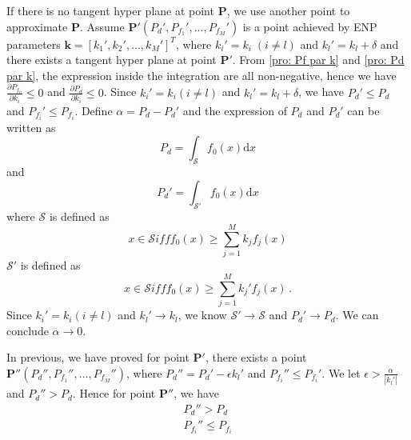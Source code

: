 \documentclass[12pt,journal,a4paper,twoside,onecolumn,draft]{IEEEtran}
\begin{document}
\begin{spacing}{2.5}
If there is no tangent hyper plane at point $\mathbf{P}$, we use another point to approximate $\mathbf{P}$. 
Assume $\mathbf{P}' (P_d', P_{f_1}', ..., P_{f_M}')$ is a point achieved by ENP parameters $\mathbf{k}=[k_1', k_2', ..., k_M']^T$, where $k_i' = k_i \;(i \neq l)$ and $k_l' = k_l + \delta$ and there exists a tangent hyper plane at point $\mathbf{P}'$. From \eqref{pro: Pf par k} and \eqref{pro: Pd par k}, the expression inside the integration are all non-negative, hence we have $\frac{\partial P_{f_n}}{\partial k_i} \leq 0$ and $\frac{\partial P_d}{\partial k_i} \leq 0$. Since $k_i' = k_i (i \neq l)$ and $k_l' = k_l + \delta$, we have $P_d' \leq P_d$ and $P_{f_i}' \leq P_{f_i}$. Define $\alpha = P_d - P_d'$ and the expression of $P_d$ and $P_d'$ can be written as
\begin{equation}
  P_d = \int_{\mathcal{S}}f_0(x)\mathrm{d}x 
\end{equation}
and
\begin{equation}
  P_d' = \int_{\mathcal{S}'}f_0(x)\mathrm{d}x 
\end{equation}
where $\mathcal{S}$ is defined as 
\begin{equation}
x \in \mathcal{S} iff f_0(x) \geq \sum_{j=1}^M k_jf_j(x)
\end{equation}
$\mathcal{S}'$ is defined as
\begin{equation}
x \in \mathcal{S} iff f_0(x) \geq \sum_{j=1}^M k_j'f_j(x)\,.
\end{equation}
Since $k_i' = k_i (i \neq l)$ and $k_l' \rightarrow k_l$, we know $\mathcal{S}' \rightarrow \mathcal{S}$ and $P_d' \rightarrow P_d$. We can conclude $\alpha \rightarrow 0$.

In previous, we have proved for point $\mathbf{P}'$, there exists a point $\mathbf{P}'' (P_d'', P_{f_1}'', ..., P_{f_M}'')$, where $P_d'' = P_d' - \epsilon k_l'$ and $P_{f_i}'' \leq P_{f_i}'$. We let $\epsilon > \frac{\alpha}{|k_l'|}$ and $P_d'' > P_d$. Hence for point $\mathbf{P}''$, we have 
\begin{equation}
\begin{split}
P_d'' > P_d\\
P_{f_i}'' \leq P_{f_i}
\end{split}
\end{equation}



\end{spacing}
\end{document}
